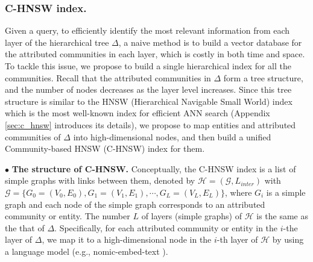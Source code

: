 % 
% 

\subsubsection{C-HNSW index.}
%
Given a query, to efficiently identify the most relevant information from each layer of the hierarchical tree $\Delta$, a naive method is to build a vector database for the attributed communities in each layer, which is costly in both time and space.
%
To tackle this issue, we propose to build a single hierarchical index for all the communities.
%
Recall that the attributed communities in $\Delta$ form a tree structure, and the number of nodes decreases as the layer level increases.
%
Since this tree structure is similar to the HNSW (Hierarchical Navigable Small World) index which is the most well-known index for efficient ANN search \cite{malkov2018efficient} (Appendix \ref{sec:c_hnsw} introduces its details), we propose to map entities and attributed communities of $\Delta$ into high-dimensional nodes, and then build a unified Community-based
HNSW (C-HNSW) index for them.


$\bullet$ \textbf{The structure of C-HNSW.}
%
Conceptually, the C-HNSW index is a list of simple graphs with links between them, denoted by $\mathcal{H} = ({\mathcal G},{L_{inter}})$ with $\mathcal{\mathcal G}=\{G_0=(V_0, E_0), G_1=(V_1, E_1), \cdots, G_L=(V_L, E_L)\}$, where $G_i$ is a simple graph and each node of the simple graph corresponds to an attributed community or entity.
%
%
The number $L$ of layers (simple graphs) of $\mathcal{H}$ is the same as the that of $\Delta$.
%
Specifically, for each attributed community or entity in the $i$-the layer of $\Delta$, we map it to a high-dimensional node in the $i$-th layer of $\mathcal H$ by using a language model (e.g., nomic-embed-text \cite{nussbaum2024nomic}).

